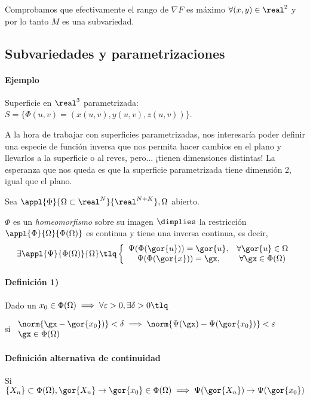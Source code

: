 Comprobamos que efectivamente el rango de $\nabla F$ es máximo $\forall (x,y)\in \real^2$ y por lo tanto $M$ es una subvariedad.

\subsection{Subvariedades y parametrizaciones}
\paragraph{Ejemplo} Superficie en $\real^3$ parametrizada: $S = \{\Phi(u,v) = (x(u,v),y(u,v),z(u,v))\}$.

A la hora de trabajar con superficies parametrizadas, nos interesaría poder definir una especie de función inversa que nos permita hacer cambios en el plano y llevarlos a la superficie o al reves, pero... ¡tienen dimensiones distintas! La esperanza que nos queda es que la superficie parametrizada tiene dimensión 2, igual que el plano.

\begin{defn}[Homeomorfismo] \label{defHomeomorfismo}
Sea $\appl{\Phi}{\Omega\subset\real^N}{\real^{N+K}}, \Omega$ abierto.

$\Phi$ es un \emph{homeomorfismo} sobre su imagen $\dimplies $ la restricción $\appl{\Phi}{\Omega}{\Phi(\Omega)}$ es continua y tiene una inversa continua,
es decir, \[\exists \appl{\Psi}{\Phi(\Omega)}{\Omega} \tlq 
\left\{ \begin{array}{cc} 
\Psi(\Phi(\gor{u})) = \gor{u}, &\forall \gor{u} \in \Omega\\ 
\Psi(\Phi(\gor{x})) = \gx, &\forall \gx \in \Phi(\Omega)
\end{array}\right.\]

\paragraph{Definición 1)}
Dado un $\displaystyle x_0 \in \Phi(\Omega) \implies \forall \varepsilon >0, \exists \delta>0 \tlq$ 

si $\begin{array}{lc}
\norm{\gx-\gor{x_0})} < \delta \implies \norm{\Psi(\gx)-\Psi(\gor{x_0})}<\varepsilon\\
\gx \in \Phi(\Omega)
\end{array}$

\paragraph{Definición alternativa de continuidad}
Si $\{X_n\}\subset\Phi(\Omega), \gor{X_n} \rightarrow \gor{x_0}\in\Phi(\Omega) \implies \Psi(\gor{X_n}) \rightarrow \Psi(\gor{x_0})$

\end{defn}

